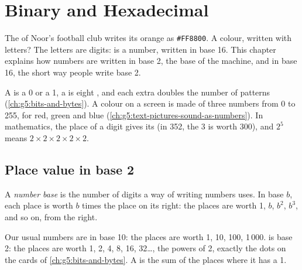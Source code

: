 \chapter{Binary and Hexadecimal}\label{ch:g8:binary-and-hexadecimal}

The  of Noor's football club writes its orange as \texttt{\#FF8800}. A
colour, written with letters? The letters are digits:  is a
number, written in base 16. This chapter explains how numbers are written in
base 2, the base of the machine, and in base 16, the short way people write
base 2.

\begin{recall}
A  is a 0 or a 1, a  is eight , and each extra  doubles the
number of patterns (\cref{ch:g5:bits-and-bytes}). A colour on a screen is
made of three numbers from 0 to 255, for red, green and blue
(\cref{ch:g5:text-pictures-sound-as-numbers}). In mathematics, the place of a
digit gives its  (in 352, the 3 is worth 300), and $2^5$ means
$2 \times 2 \times 2 \times 2 \times 2$.
\end{recall}

\section{Place value in base 2}

\begin{definition}\label{def:g8:binary-and-hexadecimal:base}
A \emph{number base} is the number of digits a way of
writing numbers uses. In base $b$, each place is worth $b$ times the place on
its right: the places are worth 1, $b$, $b^2$, $b^3$, and so on, from the
right.
\end{definition}

Our usual numbers are in base 10: the places are worth 1, 10, 100, 1\,000.
 is base 2: the places are worth 1, 2, 4, 8, 16, 32\dots, the powers of
2, exactly the dots on the cards of \cref{ch:g5:bits-and-bytes}. A  is the sum of the places where it has a 1.

